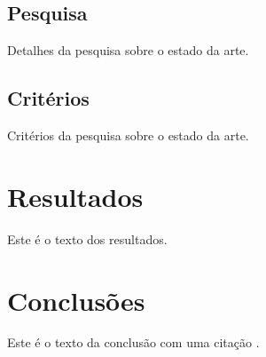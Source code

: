 \documentclass[12pt,a4paper,final]{article}
\begin{document}
    \subsection{Pesquisa}\label{subsec:pesquisa}
    Detalhes da pesquisa sobre o estado da arte.

    \subsection{Critérios}\label{subsec:criterios}
    Critérios da pesquisa sobre o estado da arte.


    \section{Resultados}\label{sec:resultados}
    Este é o texto dos resultados.

    \begin{table}[H]
        \centering
        \caption{Tabela Exemplo}
        \label{tab:my-table}
    \end{table}


    \section{Conclusões}\label{sec:conclusoes}
    Este é o texto da conclusão com uma citação \cite{su15010857}.

    \newpage
    \printbibliography
\end{document}
